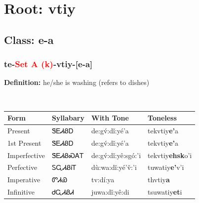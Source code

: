 \needspace{4in}
\section*{Root: vtiy}
\nopagebreak
{}
\needspace{3in}
\subsection*{Class: e-a}
\nopagebreak
\needspace{2in}
\subsubsection*{te{-}\textcolor{Red}{Set A (k)}{-}\textbf{vtiy}{-}[e-a]}
\nopagebreak
\textbf{Definition: } he/she is washing (refers to dishes)
\\[0.5em]
\begin{tabularx}{\textwidth}{l X X X}%
\toprule%
\textbf{Form}&\textbf{Syllabary}&\textbf{With Tone}&\textbf{Toneless}\\%
\midrule%
Present&ᏕᎬᏗᏰᎠ&de:gv́:dǐ:yé’a&tekvtiy\textbf{e'}a\\%
1st Present&ᏕᎬᏗᏰᎠ&de:gv́:dǐ:yé’a&tekvtiy\textbf{e'}a\\%
Imperfective&ᏕᎬᏗᏰᏍᎪᎢ&de:gv́:dǐ:yê:sgó:’i&tekvtiy\textbf{ehsk}o'i\\%
Perfective&ᏚᏩᏗᏰᎥᎢ&dù:wa:dǐ:yé’v̌:’i&tuwatiy\textbf{e'}v'i\\%
Imperative&ᏛᏗᏯ&tv:dí:ya&thvtiy\textbf{a}\\%
Infinitive&ᏧᏩᏗᏰᏗ&juwa:dǐ:yê:di&tsuwatiy\textbf{et}i\\%
\bottomrule%
\end{tabularx}
\\[1em]